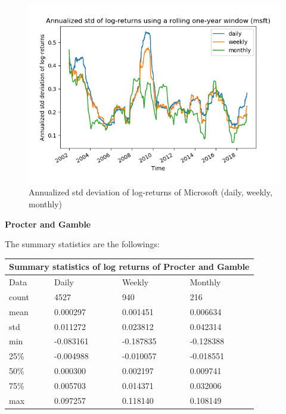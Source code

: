 \documentclass[10pt]{article}
\newenvironment{exercise}[2][Exercise]{\begin{trivlist}
  \item[\hskip \labelsep {\bfseries #1}\hskip \labelsep {\bfseries #2.}]}{\end{trivlist}}
\begin{document}
\begin{exercise}{4}
\begin{figure}[H]
		\centering
		\includegraphics[scale=0.5]{Figures/problem4d_std_msft.png}	
		\caption{Annualized std deviation of log-returns of Microsoft (daily, weekly, monthly)}	
		\label{fig:problem3d_std_msft}
	
	\end{figure}	  
  
	\bigbreak	
		
	\textbf{Procter and Gamble}
	
	\smallbreak
	
	The summary statistics are the followings:
	
	\bigbreak	
	
	\begin{tabular}{ |p{3cm}||p{3cm}|p{3cm}|p{3cm}|  }
 		\hline
		\multicolumn{4}{|c|}{Summary statistics of log returns of Procter and Gamble} \\
		\hline
		Data & Daily & Weekly & Monthly\\
 		\hline
 		count   &  4527 & 940 & 216\\
 		mean & 0.000297 & 0.001451 & 0.006634\\
 		std & 0.011272 & 0.023812 & 0.042314\\
 		min & -0.083161 & -0.187835 & -0.128388\\
 		25\% & -0.004988 & -0.010057 & -0.018551\\
 		50\% & 0.000300 & 0.002197 & 0.009741\\
 		75\% & 0.005703 & 0.014371 & 0.032006\\
 		max & 0.097257 & 0.118140 & 0.108149\\
 		\hline
	\end{tabular}
	

\end{exercise}
\end{document}
